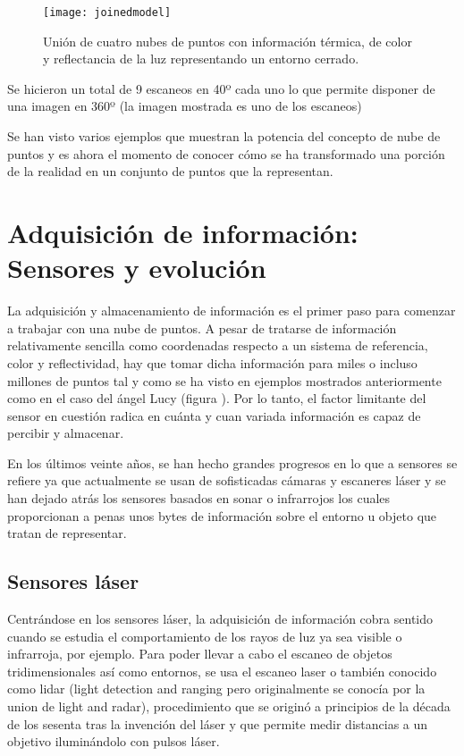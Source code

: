 \begin{figure}
\centering
\texttt{[image: joinedmodel]}
\caption{Unión de cuatro nubes de puntos con información térmica, de color y reflectancia de la luz representando un entorno cerrado.}\label{fig:joined_model}
\end{figure}

Se hicieron un total de 9 escaneos en 40º cada uno lo que permite disponer de una imagen en 360º (la imagen mostrada es uno de los escaneos)

Se han visto varios ejemplos que muestran la potencia del concepto de nube de puntos y es ahora el momento de conocer cómo se ha transformado una porción de la realidad en un conjunto de puntos que la representan.
\section{Adquisición de información: Sensores y evolución}

La adquisición y almacenamiento de información es el primer paso para comenzar a trabajar con una nube de puntos. A pesar de tratarse de información relativamente sencilla como coordenadas respecto a un sistema de referencia, color y reflectividad, hay que tomar dicha información para miles o incluso millones de puntos tal y como se ha visto en ejemplos mostrados anteriormente como en el caso del ángel Lucy (figura ). Por lo tanto, el factor limitante del sensor en cuestión radica en cuánta y cuan variada información es capaz de percibir y almacenar.

En los últimos veinte años, se han hecho grandes progresos en lo que a sensores se refiere ya que actualmente se usan de sofisticadas cámaras y escaneres láser y se han dejado atrás los sensores basados en sonar o infrarrojos los cuales proporcionan a penas unos bytes de información sobre el entorno u objeto que tratan de representar.

\subsection{Sensores láser}
Centrándose en los sensores láser, la adquisición de información cobra sentido cuando se estudia el comportamiento de los rayos de luz ya sea visible o infrarroja, por ejemplo. Para poder llevar a cabo el escaneo de objetos tridimensionales así como entornos, se usa el escaneo laser o también conocido como lidar (light detection and ranging pero originalmente se conocía por la union de light and radar), 
procedimiento que se originó a principios de la década de los sesenta tras la invención del láser y que permite medir distancias a un objetivo iluminándolo con pulsos láser.


